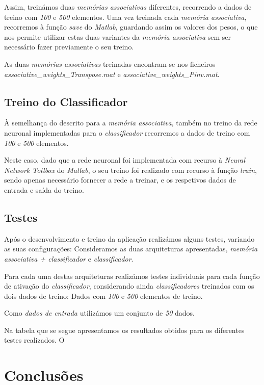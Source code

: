 \documentclass{article}
\begin{document}
Assim, treinámos duas \emph{memórias associativas} diferentes, recorrendo a dados de treino com \emph{100} e \emph{500} elementos. Uma vez treinada cada \emph{memória associativa}, recorremos à função \emph{save} do \emph{Matlab}, guardando assim os valores dos pesos, o que nos permite utilizar estas duas variantes da \emph{memória associativa} sem ser necessário fazer previamente o seu treino.

As duas \emph{memórias associativas} treinadas encontram-se nos ficheiros \emph{associative\_weights\_Transpose.mat} e \emph{associative\_weights\_Pinv.mat}.

\subsection{Treino do Classificador}

À semelhança do descrito para a \emph{memória associativa}, também no treino da rede neuronal implementadas para o \emph{classificador} recorremos a dados de treino com \emph{100} e \emph{500} elementos.

Neste caso, dado que a rede neuronal foi implementada com recurso à \emph{Neural Network Tollbox} do \emph{Matlab}, o seu treino foi realizado com recurso à função \emph{train}, sendo apenas necessário fornecer a rede a treinar, e os respetivos dados de entrada e saída do treino.

\subsection{Testes}

Após o desenvolvimento e treino da aplicação realizámos alguns testes, variando as suas configurações: Consideramos as duas arquiteturas apresentadas,  \emph{memória associativa + classificador} e \emph{classificador}.

Para cada uma destas arquiteturas realizámos testes individuais para cada função de ativação do \emph{classificador}, considerando ainda \emph{classificadores} treinados com os dois dados de treino: Dados com \emph{100} e \emph{500} elementos de treino.

Como \emph{dados de entrada} utilizámos um conjunto de \emph{50} dados.

Na tabela que se segue apresentamos os resultados obtidos para os diferentes testes realizados. O


\pagebreak

\section{Conclusões}
\end{document}
